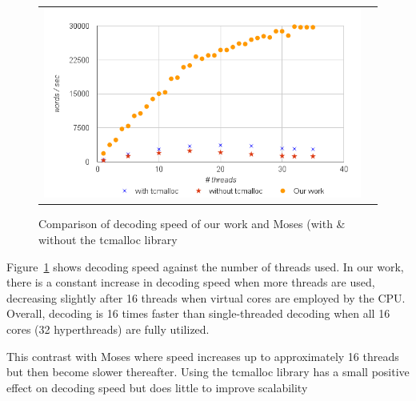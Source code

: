 \documentclass[]{article}
\begin{document}
\begin{figure}[h]
\centering
\begin{tabular}{cc}
{\includegraphics[scale=0.4]{scalability.png}} 
\end{tabular}
\caption{Comparison of decoding speed of our work and Moses (with \& without the tcmalloc library}
\label{fig:speed}
\end{figure} 

Figure~\ref{fig:speed} shows decoding speed against the number of threads used. In our work, there is a constant increase in decoding speed when more threads are used, decreasing slightly after 16 threads when virtual cores are employed by the CPU. Overall, decoding is 16 times faster than single-threaded decoding when all 16 cores (32 hyperthreads) are fully utilized.


This contrast with Moses where speed increases up to approximately 16 threads but then become slower thereafter. Using the tcmalloc library has a small positive effect on decoding speed but does little to improve scalability 

\end{document}
